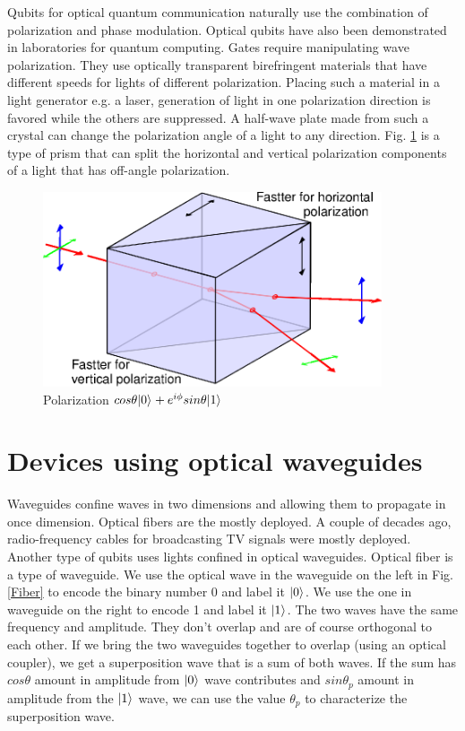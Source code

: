 \documentclass{ctexbook}
\begin{document}
Qubits for optical quantum communication naturally use the combination of polarization and phase modulation. Optical qubits have also been demonstrated in laboratories for quantum computing. Gates require manipulating wave polarization. They use optically transparent birefringent materials that have different speeds for lights of different polarization. Placing such a material in a light generator e.g. a laser, generation of light in one polarization direction is favored while the others are suppressed. A half-wave plate made from such a crystal can change the polarization angle of a light to any direction. Fig. \ref{Polarization-splitter} is a type of prism that can split the horizontal and vertical polarization components of a light that has off-angle polarization.

\begin{figure}[h]
\includegraphics[width=10cm]{pic/polarization-prism.eps}
\caption{Polarization $cos{\theta} \vert {0} \rangle_{} + e^{i \phi} sin{\theta} \vert {1} \rangle_{}$}
\label{Polarization-splitter}
\end{figure}


\section{Devices using optical waveguides}
Waveguides confine waves in two dimensions and allowing them to propagate in once dimension. Optical fibers are the mostly deployed. A couple of decades ago, radio-frequency cables for broadcasting TV signals were mostly deployed.
Another type of qubits uses lights confined in optical waveguides. Optical fiber is a type of waveguide. We use the optical wave in the waveguide on the left in Fig. \ref{Fiber} to encode the binary number 0 and label it $\vert {0} \rangle_{}$. We use the one in waveguide on the right to encode 1 and label it $\vert {1} \rangle_{}$. The two waves have the same frequency and amplitude. They don't overlap and are of course orthogonal to each other. If we bring the two waveguides together to overlap (using an optical coupler), we get a superposition wave that is a sum of both waves. If the sum has $cos\theta$ amount in amplitude from $\vert {0} \rangle_{}$ wave contributes and $sin\theta_p$ amount in amplitude from the $\vert {1} \rangle_{}$ wave, we can use the value $\theta_p$ to characterize the superposition wave.
\end{document}
